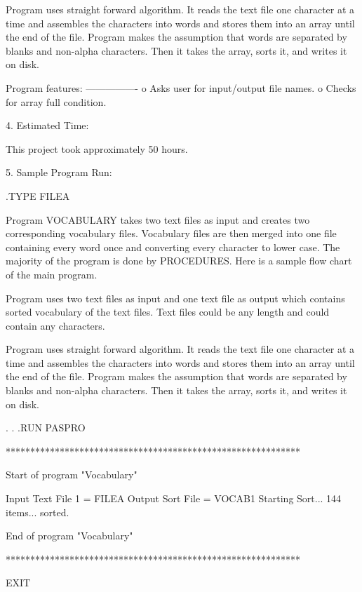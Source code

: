         Program uses straight forward algorithm. It reads the text
   file one character at a time and assembles the characters into 
   words and stores them into an array until the end of the file.
   Program makes the assumption that words are separated by blanks 
   and non-alpha characters. Then it takes the array, sorts it, and 
   writes it on disk.

        Program features:
        ----------------
        o  Asks user for input/output file names.
        o  Checks for array full condition.


4. Estimated Time:

        This project took approximately 50 hours.

5. Sample Program Run:

.TYPE FILEA


        Program VOCABULARY takes two text files as input and
   creates two corresponding vocabulary files. Vocabulary files
   are then merged into one file containing every word once and
   converting every character to lower case.
        The majority of the program is done by PROCEDURES. Here
   is a sample flow chart of the main program.

        Program uses two text files as input and one text file
   as output which contains sorted vocabulary of the text files.
   Text files could be any length and could contain any characters.

        Program uses straight forward algorithm. It reads the text
   file one character at a time and assembles the characters into 
   words and stores them into an array until the end of the file.
   Program makes the assumption that words are separated by blanks 
   and non-alpha characters. Then it takes the array, sorts it, and 
   writes it on disk.

.
.
.RUN PASPRO

************************************************************

Start of program "Vocabulary"

Input Text File 1 = FILEA
Output Sort File = VOCAB1
Starting Sort...  144 items... sorted.

End of program "Vocabulary"

************************************************************

EXIT


